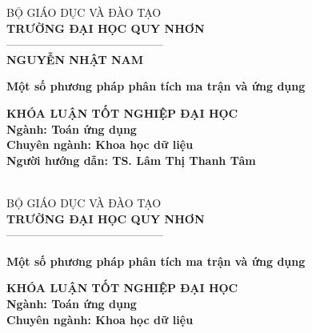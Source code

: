 \documentclass[14pt,oneside,a4paper]{report}
\numberwithin{equation}{section}
\begin{document}
\thispagestyle{empty}
\thisfancypage{\setlength{\fboxsep}{2pt}\setlength{\fboxrule}{2pt}\doublebox}{} 
\begin{center} %
	{\fontsize{14pt}{16}\selectfont BỘ GIÁO DỤC VÀ ĐÀO TẠO}\\
	\vskip 0.05cm
	{\bf\fontsize{14pt}{16}\selectfont TRƯỜNG ĐẠI HỌC QUY NHƠN}\\
	{——————————————}\\
	\vskip 2cm
	{\bf\fontsize{16pt}{22}\selectfont NGUYỄN NHẬT NAM}
	
	\vskip 3cm
	\begin{center}
		{\bf\fontsize{22pt}{22}\selectfont Một số phương pháp phân tích ma trận và ứng dụng}
		
	\end{center}
	
	\vskip 2.5cm
	{\bf\fontsize{16pt}{22}\selectfont KHÓA LUẬN TỐT NGHIỆP ĐẠI HỌC}\\
	\vskip 0.5cm
	{\bf\fontsize{16pt}{22}\selectfont Ngành: Toán ứng dụng }\\
	\vskip 0.05cm
	{\bf\fontsize{16pt}{22}\selectfont Chuyên ngành: Khoa học dữ liệu}\\
	\vskip 2.5cm
	{\bf\fontsize{16pt}{22}\selectfont Người hướng dẫn: TS. Lâm Thị Thanh Tâm}\\
	
	\vfill
	{\bf\fontsize{14pt}{16}\selectfont {Bình Định, 2023}}\\
\end{center}
\newpage
\thispagestyle{empty}


\thisfancypage{\setlength{\fboxsep}{2pt}\setlength{\fboxrule}{2pt}\doublebox}{} 
\begin{center} %
	{\fontsize{14pt}{16}\selectfont BỘ GIÁO DỤC VÀ ĐÀO TẠO}\\
	\vskip 0.05cm
	{\bf\fontsize{14pt}{16}\selectfont TRƯỜNG ĐẠI HỌC QUY NHƠN}\\
	{——————————————}\\
\end{center}

\vskip 3cm
\begin{center}
	{\bf\fontsize{22pt}{22}\selectfont Một số phương pháp phân tích ma trận và ứng dụng}
	
	
	
	\vskip 3.5cm
	{\bf\fontsize{16pt}{22}\selectfont KHÓA LUẬN TỐT NGHIỆP ĐẠI HỌC}\\
	\vskip 0.5cm
	{\bf\fontsize{16pt}{22}\selectfont Ngành: Toán ứng dụng}\\
	\vskip 0.05cm
	{\bf\fontsize{16pt}{22}\selectfont Chuyên ngành: Khoa học dữ liệu}\\
	\vskip 2.5cm
\end{center}
\end{document}
